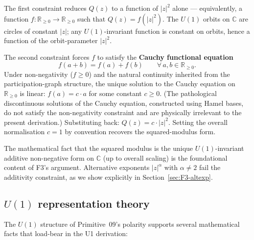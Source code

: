 \documentclass[11pt,a4paper]{article}
\begin{document}
The first constraint reduces $Q(z)$ to a function of $|z|^2$ alone --- equivalently, a function $f : \mathbb{R}_{\geq 0} \to \mathbb{R}_{\geq 0}$ such that $Q(z) = f(|z|^2)$. The $U(1)$ orbits on $\mathbb{C}$ are circles of constant $|z|$; any $U(1)$-invariant function is constant on orbits, hence a function of the orbit-parameter $|z|^2$.

The second constraint forces $f$ to satisfy the \textbf{Cauchy functional equation}
\[
f(a + b) = f(a) + f(b) \qquad \forall\, a, b \in \mathbb{R}_{\geq 0}.
\]
Under non-negativity ($f \geq 0$) and the natural continuity inherited from the participation-graph structure, the unique solution to the Cauchy equation on $\mathbb{R}_{\geq 0}$ is linear: $f(a) = c \cdot a$ for some constant $c \geq 0$. (The pathological discontinuous solutions of the Cauchy equation, constructed using Hamel bases, do not satisfy the non-negativity constraint and are physically irrelevant to the present derivation.) Substituting back: $Q(z) = c \cdot |z|^2$. Setting the overall normalisation $c = 1$ by convention recovers the squared-modulus form.

The mathematical fact that the squared modulus is the unique $U(1)$-invariant additive non-negative form on $\mathbb{C}$ (up to overall scaling) is the foundational content of F3's argument. Alternative exponents $|z|^\alpha$ with $\alpha \neq 2$ fail the additivity constraint, as we show explicitly in Section~\ref{sec:F3-altexp}.

\subsection{$U(1)$ representation theory}

The $U(1)$ structure of Primitive~09's polarity supports several mathematical facts that load-bear in the U1 derivation:
\end{document}
